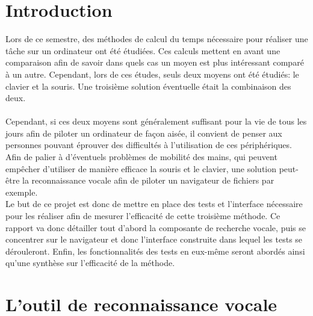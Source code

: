 \documentclass[a4paper, 11pt]{report}
\begin{document}
	\newpage
	
	
	
	\chapter*{Introduction}
	
	Lors de ce semestre, des méthodes de calcul du temps nécessaire pour réaliser une tâche sur un ordinateur ont été étudiées. Ces calculs mettent en avant une comparaison afin de savoir dans quels cas un moyen est plus intéressant comparé à un autre. Cependant, lors de ces études, seuls deux moyens ont été étudiés: le clavier et la souris. Une troisième solution éventuelle était la combinaison des deux.\\ \ \\
	Cependant, si ces deux moyens sont généralement suffisant pour la vie de tous les jours afin de piloter un ordinateur de façon aisée, il convient de penser aux personnes pouvant éprouver des difficultés à l'utilisation de ces périphériques. Afin de palier à d'éventuels problèmes de mobilité des mains, qui peuvent empêcher d'utiliser de manière efficace la souris et le clavier, une solution peut-être la reconnaissance vocale afin de piloter un navigateur de fichiers par exemple.\\
	Le but de ce projet est donc de mettre en place des tests et l'interface nécessaire pour les réaliser afin de mesurer l'efficacité de cette troisième méthode. Ce rapport va donc détailler tout d'abord la composante de recherche vocale, puis se concentrer sur le navigateur et donc l'interface construite dans lequel les tests se dérouleront. Enfin, les fonctionnalités des tests en eux-même seront abordés ainsi qu'une synthèse sur l'efficacité de la méthode.
	
	\chapter{L'outil de reconnaissance vocale}
	
\end{document}
